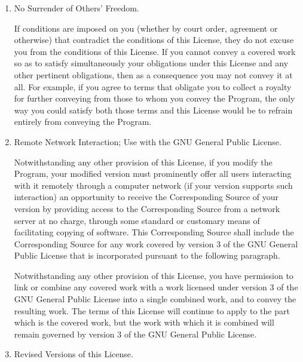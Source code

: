 \documentclass[10pt,a4paper,ngerman,titlepage,tocindentauto]{article}
\begin{document}
\begin{multicols}{3}
{\begin{enumerate}
					Nothing in this License shall be construed as excluding or limiting
					any implied license or other defenses to infringement that may
					otherwise be available to you under applicable patent law.

					\item No Surrender of Others' Freedom.

					If conditions are imposed on you (whether by court order, agreement or
					otherwise) that contradict the conditions of this License, they do not
					excuse you from the conditions of this License.  If you cannot convey a
					covered work so as to satisfy simultaneously your obligations under this
					License and any other pertinent obligations, then as a consequence you may
					not convey it at all.  For example, if you agree to terms that obligate you
					to collect a royalty for further conveying from those to whom you convey
					the Program, the only way you could satisfy both those terms and this
					License would be to refrain entirely from conveying the Program.

					\item Remote Network Interaction; Use with the GNU General Public License.

					Notwithstanding any other provision of this License, if you modify the
					Program, your modified version must prominently offer all users interacting
					with it remotely through a computer network (if your version supports such
					interaction) an opportunity to receive the Corresponding Source of your
					version by providing access to the Corresponding Source from a network
					server at no charge, through some standard or customary means of
					facilitating copying of software.  This Corresponding Source shall include
					the Corresponding Source for any work covered by version 3 of the GNU
					General Public License that is incorporated pursuant to the following
					paragraph.

					Notwithstanding any other provision of this License, you have permission to
					link or combine any covered work with a work licensed under version 3 of
					the GNU General Public License into a single combined work, and to convey
					the resulting work.  The terms of this License will continue to apply to
					the part which is the covered work, but the work with which it is combined
					will remain governed by version 3 of the GNU General Public License.

					\item Revised Versions of this License.


\end{enumerate}}
\end{multicols}
\end{document}
